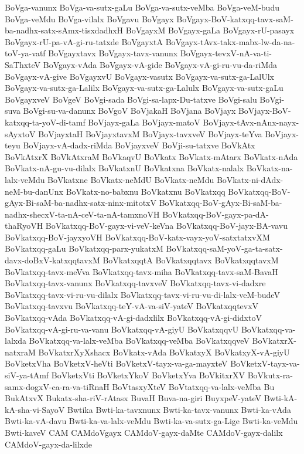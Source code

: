 {BoVga-vanunx
BoVga-va-sutx-gaLu
BoVga-va-sutx-veMba
BoVga-veM-budu
BoVga-veMdu
BoVga-vilalx
BoVgavu
BoVgayx
BoVgayx-BoV-katxqq-tavx-saM-ba-nadhx-satx-sAmx-tisxdadhxH
BoVgayxM
BoVgayx-gaLa
BoVgayx-rU-pasayx
BoVgayx-rU-pa-vA-gi-ru-tatxde
BoVgayxtA
BoVgayx-tAvx-takx-mabx-lw-da-na-toV-ya-vatf
BoVgayxtavx
BoVgayx-tavx-vanunx
BoVgayx-tevxV-nA-va-ti-SaThxteV
BoVgayx-vAda
BoVgayx-vA-gide
BoVgayx-vA-gi-ru-vu-da-riMda
BoVgayx-vA-give
BoVgayxvU
BoVgayx-vasutx
BoVgayx-va-sutx-ga-LalUlx
BoVgayx-va-sutx-ga-Lalilx
BoVgayx-va-sutx-ga-Lalulx
BoVgayx-va-sutx-gaLu
BoVgayxveV
BoVgeV
BoVgi-sada
BoVgi-sa-lapx-Du-tatxve
BoVgi-salu
BoVgi-suva
BoVgi-su-va-danunx
BoVgoV
BoVjakaH
BoVjana
BoVjayx
BoVjayx-BoV-katxqq-ta-yoV-di-tamf
BoVjayx-gaLa
BoVjayx-matoV
BoVjayx-tAvx-nAnx-nayx-sAyxtoV
BoVjayxtaH
BoVjayxtavxM
BoVjayx-tavxveV
BoVjayx-teYva
BoVjayx-teyu
BoVjayx-vA-dadx-riMda
BoVjayxveV
BoVji-su-tatxve
BoVkAtx
BoVkAtxrX
BoVkAtxraM
BoVkaqvU
BoVkatx
BoVkatx-mAtarx
BoVkatx-nAda
BoVkatx-nA-gu-vu-dilalx
BoVkatxnU
BoVkatxna
BoVkatx-nalalx
BoVkatx-na-lalx-veMdu
BoVkatxne
BoVkatx-neMdU
BoVkatx-neMdu
BoVkatx-ni-dAdx-neM-bu-danUnx
BoVkatx-no-babxnu
BoVkatxnu
BoVkatxqq
BoVkatxqq-BoV-gAyx-Bi-saM-ba-nadhx-satx-ninx-mitotxV
BoVkatxqq-BoV-gAyx-Bi-saM-ba-nadhx-shecxV-ta-nA-ceV-ta-nA-tamxnoVH
BoVkatxqq-BoV-gayx-pa-dA-thaRyoVH
BoVkatxqq-BoV-gayx-vi-veV-keVna
BoVkatxqq-BoV-jayx-BA-vavu
BoVkatxqq-BoV-jayxyoVH
BoVkatxqq-BoV-katx-vayx-yoV-satxtatxvXM
BoVkatxqq-gaLu
BoVkatxqq-parx-yukatxM
BoVkatxqq-saM-yoV-ga-ta-satx-davx-doBxV-katxqqtavxM
BoVkatxqqtA
BoVkatxqqtavx
BoVkatxqqtavxM
BoVkatxqq-tavx-meVva
BoVkatxqq-tavx-miha
BoVkatxqq-tavx-saM-BavaH
BoVkatxqq-tavx-vanunx
BoVkatxqq-tavxveV
BoVkatxqq-tavx-vi-dadxre
BoVkatxqq-tavx-vi-ru-vu-dilalx
BoVkatxqq-tavx-vi-ru-vu-di-lalx-veM-budeV
BoVkatxqq-tavxvu
BoVkatxqq-teY-vA-va-siV-yateV
BoVkatxqqtevxV
BoVkatxqq-vAda
BoVkatxqq-vA-gi-dadxlilx
BoVkatxqq-vA-gi-didxtoV
BoVkatxqq-vA-gi-ru-va-vanu
BoVkatxqq-vA-giyU
BoVkatxqqvU
BoVkatxqq-va-lalxda
BoVkatxqq-va-lalx-veMba
BoVkatxqq-veMba
BoVkatxqqveV
BoVkatxrX-natxraM
BoVkatxrXyXshacx
BoVkatx-vAda
BoVkatxyX
BoVkatxyX-vA-giyU
BoVketxVha
BoVketxV-heVti
BoVketxV-tayx-va-ga-mayxteV
BoVketxV-tayx-va-siV-ya-tAmf
BoVketxVti
BoVketxYkoV
BoVketxYva
BoVkitxrXV
BoVkutx-ra-samx-dogxV-ca-ra-va-tiRnaH
BoVtasxyXteV
BoVtatxqq-va-lalx-veMba
Bu
BukAtxvX
Bukatx-sha-riV-rAtasx
BuvaH
Buva-na-giri
BuyxpeV-yateV
Bwti-kA-kA-sha-vi-SayoV
Bwtika
Bwti-ka-tavxnunx
Bwti-ka-tavx-vanunx
Bwti-ka-vAda
Bwti-ka-vA-davu
Bwti-ka-va-lalx-veMdu
Bwti-ka-va-sutx-ga-Lige
Bwti-ka-veMdu
Bwti-kaveV
CAM
CAMdoVgayx
CAMdoV-gayx-daMte
CAMdoV-gayx-dalilx
CAMdoV-gayx-da-lilxde
}
